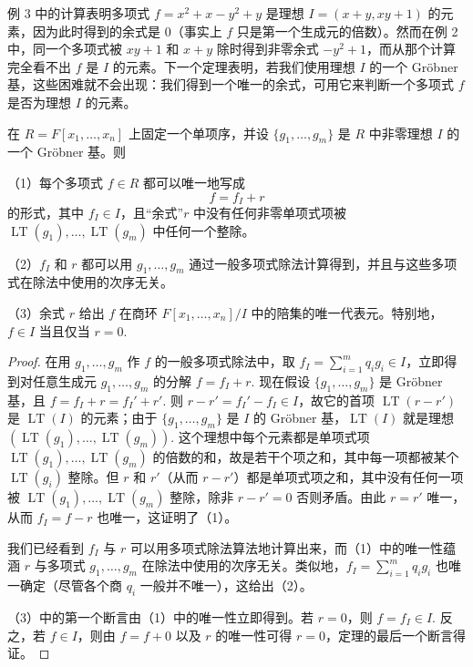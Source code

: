 例 3 中的计算表明多项式 \(f = x^2+x-y^2+y\) 是理想 \(I = (x+y, xy+1)\) 的元素，因为此时得到的余式是 0（事实上 \(f\) 只是第一个生成元的倍数）。然而在例 2 中，同一个多项式被 \(xy+1\) 和 \(x+y\) 除时得到非零余式 \(-y^2+1\)，而从那个计算完全看不出 \(f\) 是 \(I\) 的元素。下一个定理表明，若我们使用理想 \(I\) 的一个 Gröbner 基，这些困难就不会出现：我们得到一个唯一的余式，可用它来判断一个多项式 \(f\) 是否为理想 \(I\) 的元素。

\begin{theorem}\label{thm:9.23}
在 \(R = F[x_1, \ldots, x_n]\) 上固定一个单项序，并设 \(\{g_1, \ldots, g_m\}\) 是 \(R\) 中非零理想 \(I\) 的一个 Gröbner 基。则

（1）每个多项式 \(f \in R\) 都可以唯一地写成
\[
f = f_I + r
\]
的形式，其中 \(f_I \in I\)，且“余式”\(r\) 中没有任何非零单项式项被 \(\operatorname{LT}(g_1), \ldots, \operatorname{LT}(g_m)\) 中任何一个整除。

（2）\(f_I\) 和 \(r\) 都可以用 \(g_1, \ldots, g_m\) 通过一般多项式除法计算得到，并且与这些多项式在除法中使用的次序无关。

（3）余式 \(r\) 给出 \(f\) 在商环 \(F[x_1, \ldots, x_n]/I\) 中的陪集的唯一代表元。特别地，\(f \in I\) 当且仅当 \(r = 0\).
\end{theorem}

\begin{proof}
在用 \(g_1, \ldots, g_m\) 作 \(f\) 的一般多项式除法中，取 \(f_I = \sum_{i=1}^m q_ig_i \in I\)，立即得到对任意生成元 \(g_1, \ldots, g_m\) 的分解 \(f = f_I+r\). 现在假设 \(\{g_1, \ldots, g_m\}\) 是 Gröbner 基，且 \(f = f_I+r = f_I'+r'\). 则 \(r-r' = f_I'-f_I \in I\)，故它的首项 \(\operatorname{LT}(r-r')\) 是 \(\operatorname{LT}(I)\) 的元素；由于 \(\{g_1, \ldots, g_m\}\) 是 \(I\) 的 Gröbner 基，\(\operatorname{LT}(I)\) 就是理想 \((\operatorname{LT}(g_1), \ldots, \operatorname{LT}(g_m))\). 这个理想中每个元素都是单项式项 \(\operatorname{LT}(g_1), \ldots, \operatorname{LT}(g_m)\) 的倍数的和，故是若干个项之和，其中每一项都被某个 \(\operatorname{LT}(g_i)\) 整除。但 \(r\) 和 \(r'\)（从而 \(r-r'\)）都是单项式项之和，其中没有任何一项被 \(\operatorname{LT}(g_1), \ldots, \operatorname{LT}(g_m)\) 整除，除非 \(r-r' = 0\) 否则矛盾。由此 \(r = r'\) 唯一，从而 \(f_I = f-r\) 也唯一，这证明了（1）。

我们已经看到 \(f_I\) 与 \(r\) 可以用多项式除法算法地计算出来，而（1）中的唯一性蕴涵 \(r\) 与多项式 \(g_1, \ldots, g_m\) 在除法中使用的次序无关。类似地，\(f_I = \sum_{i=1}^m q_ig_i\) 也唯一确定（尽管各个商 \(q_i\) 一般并不唯一），这给出（2）。

（3）中的第一个断言由（1）中的唯一性立即得到。若 \(r = 0\)，则 \(f = f_I \in I\). 反之，若 \(f \in I\)，则由 \(f = f+0\) 以及 \(r\) 的唯一性可得 \(r = 0\)，定理的最后一个断言得证。
\end{proof}

